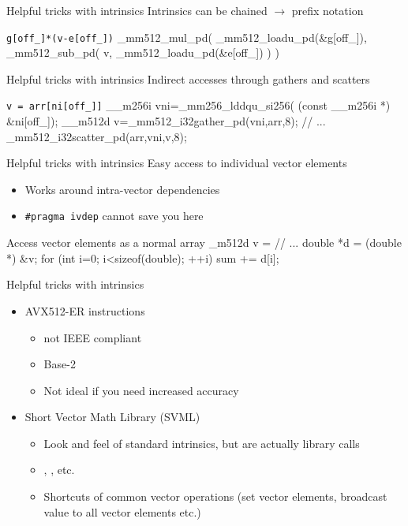 \documentclass[aspectratio=1610,14pt]{beamer}
\begin{document}
\begin{frame}[fragile]{Helpful tricks with intrinsics}
  Intrinsics can be chained $\rightarrow$ prefix notation
    \vfill
  \begin{Cpplisting}{\texttt{g[off\_]*(v-e[off\_])}}
_mm512_mul_pd(
    _mm512_loadu_pd(&g[off_]),
    _mm512_sub_pd(
        v, _mm512_loadu_pd(&e[off_])
    )
)
  \end{Cpplisting}
\end{frame}

\begin{frame}[fragile]{Helpful tricks with intrinsics}
  Indirect accesses through gathers and scatters
  \vfill
  \begin{Cpplisting}{\texttt{v = arr[ni[off\_]]}}
__m256i vni=_mm256_lddqu_si256(
    (const __m256i *) &ni[off_]);
__m512d v=_mm512_i32gather_pd(vni,arr,8);
// ...
_mm512_i32scatter_pd(arr,vni,v,8);
  \end{Cpplisting}
\end{frame}

\begin{frame}[fragile]{Helpful tricks with intrinsics}
  Easy access to individual vector elements
  \begin{itemize}
  \item Works around intra-vector dependencies
  \item \texttt{\#pragma ivdep} cannot save you here
  \end{itemize}
  \vfill
  \begin{Cpplisting}{Access vector elements as a normal array}
_m512d v = // ...
double *d = (double *) &v;
for (int i=0; i<sizeof(double); ++i) {
    sum += d[i];
}
  \end{Cpplisting}
\end{frame}

\begin{frame}[fragile]{Helpful tricks with intrinsics}
  \begin{itemize}
  \item AVX512-ER instructions
    \begin{itemize}
    \item not IEEE compliant
    \item Base-2
    \item Not ideal if you need increased accuracy
    \end{itemize}
  \item Short Vector Math Library (SVML)
    \begin{itemize}
    \item Look and feel of standard intrinsics, but are actually library calls
    \item {}, ,  etc.
    \item Shortcuts of common vector operations (set vector elements, broadcast value to all vector elements etc.)
    \end{itemize}
  \end{itemize}
\end{frame}
\end{document}
